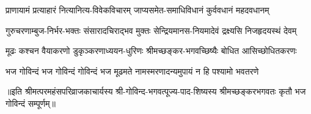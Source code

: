 \begin{large}
\begin{multicols}{2}
\begin{flushleft}
\fourlineindentedshloka
{प्राणायामं प्रत्याहारं}
{नित्यानित्य-विवेकविचारम्}
{जाप्यसमेत-समाधिविधानं}
{कुर्ववधानं महदवधानम्}

\fourlineindentedshloka
{गुरुचरणाम्बुज-निर्भर-भक्तः}
{संसारादचिराद्भव मुक्तः}
{सेन्द्रियमानस-नियमादेवं}
{द्रक्ष्यसि निजहृदयस्थं देवम्}

\fourlineindentedshloka
{मूढः कश्चन वैयाकरणो}
{डुकृञ्करणाध्ययन-धुरिणः}
{श्रीमच्छङ्कर-भगवच्छिष्यैः}
{बोधित आसिच्छोधितकरणः}

\fourlineindentedshloka
{भज गोविन्दं भज गोविन्दं}
{गोविन्दं भज मूढमते}
{नामस्मरणादन्यमुपायं}
{न हि पश्यामो भवतरणे}

\fourlineshloka{}{}{}{}
\fourlineshloka{}{}{}{}
\end{flushleft}
\end{multicols}
॥इति श्रीमत्परमहंसपरिव्राजकाचार्यस्य श्री-गोविन्द-भगवत्पूज्य-पाद-शिष्यस्य
श्रीमच्छङ्करभगवतः कृतौ भज गोविन्दं सम्पूर्णम्॥
\end{large}
\setlength{\shlokaspaceskip}{24pt}
\setlength{\columnseprule}{1pt}
\setlength{\columnsep}{30pt}